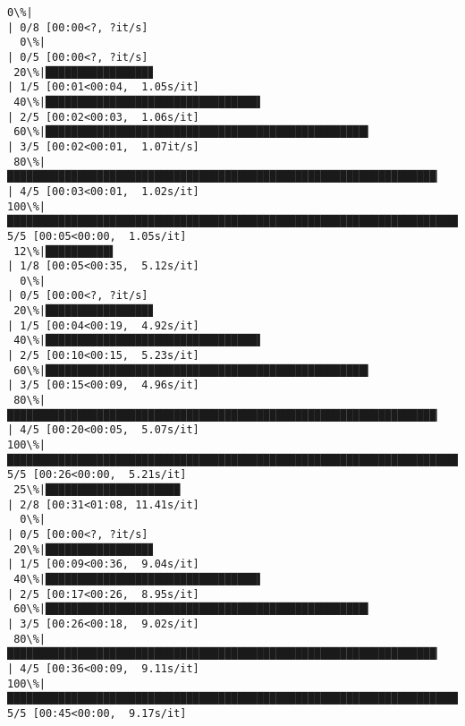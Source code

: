 \documentclass[11pt]{article}
\begin{document}
    \begin{Verbatim}[commandchars=\\\{\}]
  0\%|                                                                                            | 0/8 [00:00<?, ?it/s]
  0\%|                                                                                            | 0/5 [00:00<?, ?it/s]
 20\%|████████████████▊                                                                   | 1/5 [00:01<00:04,  1.05s/it]
 40\%|█████████████████████████████████▌                                                  | 2/5 [00:02<00:03,  1.06s/it]
 60\%|██████████████████████████████████████████████████▍                                 | 3/5 [00:02<00:01,  1.07it/s]
 80\%|███████████████████████████████████████████████████████████████████▏                | 4/5 [00:03<00:01,  1.02s/it]
100\%|████████████████████████████████████████████████████████████████████████████████████| 5/5 [00:05<00:00,  1.05s/it]
 12\%|██████████▌                                                                         | 1/8 [00:05<00:35,  5.12s/it]
  0\%|                                                                                            | 0/5 [00:00<?, ?it/s]
 20\%|████████████████▊                                                                   | 1/5 [00:04<00:19,  4.92s/it]
 40\%|█████████████████████████████████▌                                                  | 2/5 [00:10<00:15,  5.23s/it]
 60\%|██████████████████████████████████████████████████▍                                 | 3/5 [00:15<00:09,  4.96s/it]
 80\%|███████████████████████████████████████████████████████████████████▏                | 4/5 [00:20<00:05,  5.07s/it]
100\%|████████████████████████████████████████████████████████████████████████████████████| 5/5 [00:26<00:00,  5.21s/it]
 25\%|█████████████████████                                                               | 2/8 [00:31<01:08, 11.41s/it]
  0\%|                                                                                            | 0/5 [00:00<?, ?it/s]
 20\%|████████████████▊                                                                   | 1/5 [00:09<00:36,  9.04s/it]
 40\%|█████████████████████████████████▌                                                  | 2/5 [00:17<00:26,  8.95s/it]
 60\%|██████████████████████████████████████████████████▍                                 | 3/5 [00:26<00:18,  9.02s/it]
 80\%|███████████████████████████████████████████████████████████████████▏                | 4/5 [00:36<00:09,  9.11s/it]
100\%|████████████████████████████████████████████████████████████████████████████████████| 5/5 [00:45<00:00,  9.17s/it]

\end{Verbatim}
\end{document}
